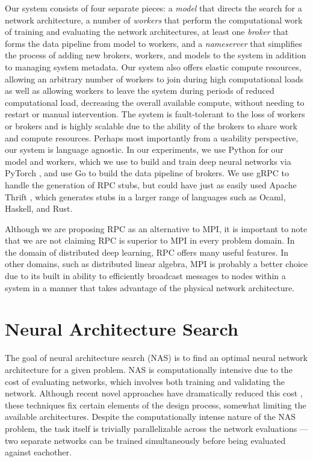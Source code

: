 \documentclass[conference]{IEEEtran}
\begin{document}
Our system consists of four separate pieces: a \emph{model} that directs the
search for a network architecture, a number of \emph{workers} that perform the
computational work of training and evaluating the network architectures, at
least one \emph{broker} that forms the data pipeline from model to workers, and
a \emph{nameserver} that simplifies the process of adding new brokers, workers,
and models to the system in addition to managing system metadata. Our system
also offers elastic compute resources, allowing an arbitrary number of workers
to join during high computational loads as well as allowing workers to leave the
system during periods of reduced computational load, decreasing the overall
available compute, without needing to restart or manual intervention.  The
system is fault-tolerant to the loss of workers or brokers and is highly
scalable due to the ability of the brokers to share work and compute
resources. Perhaps most importantly from a usability perspective, our system is
language agnostic. In our experiments, we use Python for our model and workers,
which we use to build and train deep neural networks via PyTorch
\cite{paszke2017automatic}, and use Go to build the data pipeline of brokers. We
use gRPC \cite{Wang:1993:GCC:155870.155881} to handle the generation of RPC
stubs, but could have just as easily used Apache Thrift \cite{Slee2007}, which
generates stubs in a larger range of languages such as Ocaml, Haskell, and Rust.

Although we are proposing RPC as an alternative to MPI, it is important to note
that we are not claiming RPC is superior to MPI in every problem domain. In the
domain of distributed deep learning, RPC offers many useful features. In other
domains, such as distributed linear algebra, MPI is probably a better choice due
to its built in ability to efficiently broadcast messages to nodes within a
system in a manner that takes advantage of the physical network architecture.

\section{Neural Architecture Search}
The goal of neural architecture search (NAS) is to find an optimal neural
network architecture for a given problem. NAS is computationally intensive due
to the cost of evaluating networks, which involves both training and validating
the network.
Although recent novel approaches have dramatically reduced
this cost \cite{DBLP:journals/corr/abs-1708-05344, pmlr-v80-pham18a}, these
techniques fix certain elements of the design process, somewhat limiting the
available architectures. Despite the computationally intense nature of the NAS
problem, the task itself is trivially parallelizable across the network
evaluations --- two separate networks can be trained simultaneously before being
evaluated against eachother.
\end{document}
